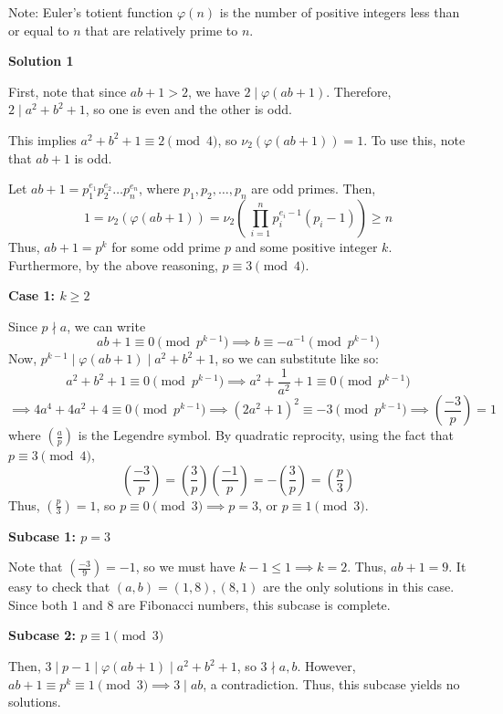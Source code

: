 \begin{enumerate}
 Note: Euler’s totient function $\varphi(n)$ is the number of positive integers less than
or equal to $n$ that are relatively prime to $n$.


 



\textbf{Solution 1}

First, note that since $ab+1 > 2$, we have $2\mid \varphi (ab+1)$. Therefore, $2\mid a^2+b^2+1$, so one is even and the other is odd. 

 This implies $a^2+b^2+1\equiv 2\pmod{4}$, so $\nu _2 (\varphi(ab+1))=1$. To use this, note that $ab+1$ is odd.

 Let $ab+1 = p_1^{e_1}p_2^{e_2}\dots p_n^{e_n}$, where $p_1, p_2, \dots, p_n$ are odd primes. Then, 
 \[1 = \nu _2 (\varphi (ab+1)) = \nu _2 \left (\ \prod_{i=1}^{n} p_i^{e_i-1}(p_i-1) \right ) \geq n\] Thus, $ab+1 = p^k$ for some odd prime $p$ and some positive integer $k$. Furthermore, by the above reasoning, $p \equiv 3 \pmod{4}$.

 
\textbf{Case 1: $k\geq 2$}

 Since $p\nmid a$, we can write 
 \[ab+1 \equiv 0 \pmod{p^{k-1}}\implies b\equiv -a^{-1} \pmod{p^{k-1}}\] Now, $p^{k-1} \mid \varphi (ab+1) \mid a^2+b^2+1$, so we can substitute like so:
 \[a^2+b^2+1 \equiv 0 \pmod{p^{k-1}} \implies a^2+\frac{1}{a^2}+1\equiv 0 \pmod{p^{k-1}}\]
 \[\implies 4a^4+4a^2+4 \equiv 0 \pmod{p^{k-1}} \implies (2a^2+1)^2 \equiv -3 \pmod{p^{k-1}}\implies \left(\frac{-3}{p}\right) = 1\] where $\left(\frac{a}{p}\right)$ is the Legendre symbol. By quadratic reprocity, using the fact that $p\equiv 3 \pmod{4}$, 
 \[\left(\frac{-3}{p}\right) =\left(\frac{3}{p}\right) \left(\frac{-1}{p}\right) = -\left(\frac{3}{p}\right) = \left(\frac{p}{3}\right)\] Thus, $\left(\frac{p}{3}\right) = 1$, so $p\equiv 0 \pmod{3}\implies p=3$, or $p\equiv 1 \pmod{3}$. 

 
\textbf{Subcase 1: $p=3$}

 Note that $\left(\frac{-3}{9}\right) = -1$, so we must have $k-1\leq 1\implies k=2$. Thus, $ab+1 = 9$. It easy to check that $(a,b) = (1, 8), (8, 1)$ are the only solutions in this case. Since both $1$ and $8$ are Fibonacci numbers, this subcase is complete.

 
\textbf{Subcase 2: $p\equiv 1 \pmod{3}$} 

 Then, $3 \mid p-1 \mid \varphi (ab+1) \mid a^2+b^2+1$, so $3\nmid a, b$. However, $ab+1 \equiv p^k \equiv 1 \pmod{3}\implies 3 \mid ab$, a contradiction. Thus, this subcase yields no solutions.


\end{enumerate}
